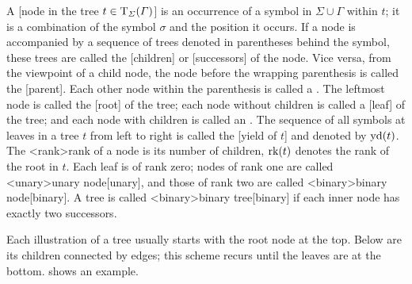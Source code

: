 \documentclass[../document.tex]{subfiles}
\begin{document}
    A [node in the tree \(t \in \operatorname{T}_\varSigma(\varGamma)\)] is an occurrence of a symbol in \(\varSigma \cup \varGamma\) within \(t\); it is a combination of the symbol \(\sigma\) and the position it occurs.
    If a node is accompanied by a sequence of trees denoted in parentheses behind the symbol, these trees are called the [children] or [successors] of the node.
    Vice versa, from the viewpoint of a child node, the node before the wrapping parenthesis is called the [parent].
    Each other node within the parenthesis is called a .
    The leftmost node is called the [root] of the tree; each node without children is called a [leaf] of the tree; and each node with children is called an .
    The sequence of all symbols at leaves in a tree \(t\) from left to right is called the [yield of \(t\)] and denoted by \(\operatorname{yd}(t)\).
    The <rank>{rank of a node} is its number of children, \(\operatorname{rk}(t)\) denotes the rank of the root in \(t\).
    Each leaf is of rank zero; nodes of rank one are called <unary>{unary node}[unary], and those of rank two are called <binary>{binary node}[binary].
    A tree is called <binary>{binary tree}[binary] if each inner node has exactly two successors.

    Each illustration of a tree usually starts with the root node at the top. Below are its children connected by edges; this scheme recurs until the leaves are at the bottom.
     shows an example.
\end{document}
